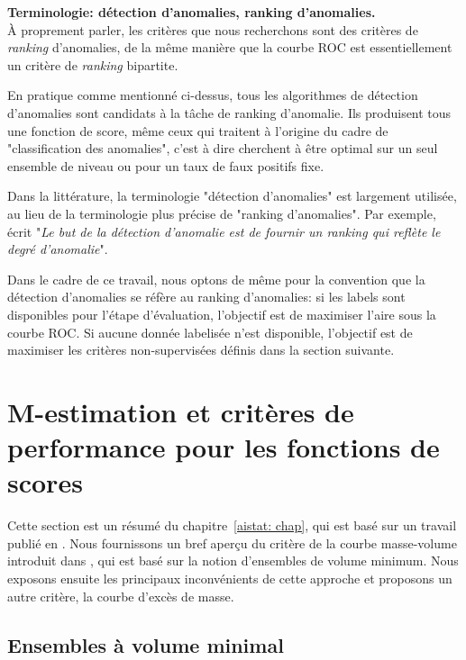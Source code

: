 \begin{remarque}{\bf Terminologie: détection d'anomalies, ranking d'anomalies.\\}
À proprement parler, les critères que nous recherchons sont des critères de \emph{ranking} d'anomalies, de la même manière que la courbe ROC est essentiellement un critère de \emph{ranking} bipartite.
%

En pratique comme mentionné ci-dessus, tous les algorithmes de détection d'anomalies sont candidats à la tâche de ranking d'anomalie. Ils produisent tous une fonction de score, même ceux qui traitent à l'origine du cadre de "classification des anomalies", c'est à dire cherchent à être optimal sur un seul ensemble de niveau ou pour un taux de faux positifs fixe.

Dans la littérature, la terminologie "détection d'anomalies" est largement utilisée, au lieu de la terminologie plus précise de "ranking d'anomalies". Par exemple, \cite{Liu2008} écrit "\emph{Le but de la détection d'anomalie est de fournir un ranking qui reflète le degré d'anomalie}".

Dans le cadre de ce travail, nous optons de même pour la convention que la détection d'anomalies se réfère au ranking d'anomalies: si les labels sont disponibles pour l'étape d'évaluation, l'objectif est de maximiser l'aire sous la courbe ROC. Si aucune donnée labelisée n'est disponible, l'objectif est de maximiser les critères non-supervisées définis dans la section suivante.

\end{remarque}


\section{M-estimation et critères de performance pour les fonctions de scores}
\label{resume_fr:scoring}
Cette section est un résumé du chapitre~\ref{aistat: chap}, qui est basé sur un travail publié en \cite{AISTAT15}. Nous fournissons un bref aperçu du critère de la courbe masse-volume introduit dans \cite{CLEM13}, qui est basé sur la notion d'ensembles de volume minimum. Nous exposons ensuite les principaux inconvénients de cette approche et proposons un autre critère, la courbe d'excès de masse.

\subsection{Ensembles à volume minimal}
\label{resume_fr:mv-set}

